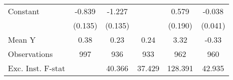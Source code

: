 {\begin{tabular}{l*{5}{c}}
\addlinespace
Constant            &      -0.839\sym{***}&      -1.227\sym{***}&                     &       0.579\sym{***}&      -0.038         \\
                    &     (0.135)         &     (0.135)         &                     &     (0.190)         &     (0.041)         \\
\midrule
Mean Y              &        0.38         &        0.23         &        0.24         &        3.32         &       -0.33         \\
Observations        &         997         &         936         &         933         &         962         &         960         \\
Exc. Inst. F-stat   &                     &      40.366         &      37.429         &     128.391         &      42.935         \\
\bottomrule
\end{tabular}
}
